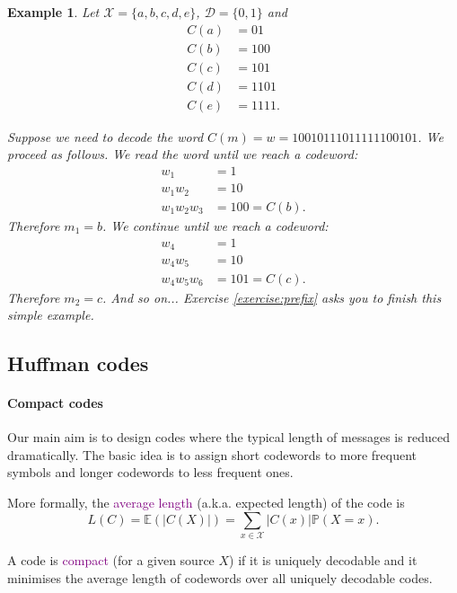 \documentclass[a4paper, 11pt, openany]{book}
\numberwithin{equation}{section}
\theoremstyle{plain}
\newtheorem{example}	[equation]	{Example}
\theoremstyle{definition}
\newcommand{\probability}{\mathbb{P}}
\newcommand{\expectation}{\mathbb{E}}
\newcommand{\Define}[1]{\textcolor{purple}{#1}}
\begin{document}
\begin{example}
Let $\mathcal{X} = \{a, b, c, d, e\}$, $\mathcal{D} = \{0,1\}$ and 
\begin{align*}
    C(a) &= 01\\
    C(b) &= 100\\
    C(c) &= 101\\
    C(d) &= 1101\\
    C(e) &= 1111.
\end{align*}

Suppose we need to decode the word $C(m) = w = 10010111011111100101$. We proceed as follows. We read the word until we reach a codeword:
\begin{align*}
    w_1 &= 1\\
    w_1 w_2 &= 10\\
    w_1 w_2 w_3 &= 100 = C(b). 
\end{align*}
Therefore $m_1 = b$. We continue until we reach a codeword:
\begin{align*}
    w_4 &= 1\\
    w_4 w_5 &= 10\\
    w_4 w_5 w_6 &= 101 = C(c). 
\end{align*}
Therefore $m_2 = c$. And so on... Exercise \ref{exercise:prefix} asks you to finish this simple example.
\end{example}




\subsection{Huffman codes}


\paragraph{Compact codes}

Our main aim is to design codes where the typical length of messages is reduced dramatically. The basic idea is to assign short codewords to more frequent symbols and longer codewords to less frequent ones.


More formally, the \Define{average length} (a.k.a. expected length) of the code is 
\[
    L(C) = \expectation( |C(X)| ) = \sum_{x \in \mathcal{X}} |C(x)| \probability(X = x).
\]

A code is \Define{compact} (for a given source $X$) if it is uniquely decodable and it minimises the average length of codewords over all uniquely decodable codes.
\end{document}
